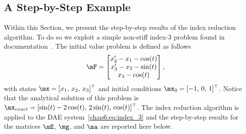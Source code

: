\subsection{A Step-by-Step Example}
\label{chap6:sec:step_by_step}

Within this Section, we present the step-by-step results of the index reduction algorithm. To do so we exploit a simple non-stiff index-3 problem found in \Wolfram{}~\Mathematica{} documentation~\cite{mathematica}. The initial value problem is defined as follows
%
\begin{equation}
  \label{chap6:eq:index_3}
  \mF = \begin{bmatrix}
    x^{\prime}_{2} - x_{1} - \cos(t) \\
    x^{\prime}_{3} - x_{2} - \sin(t) \\
    x_{3} - \cos(t)
  \end{bmatrix},
\end{equation}
%
with states $\mx = [x_{1}, \, x_{2}, \, x_{3}]^\top$ and initial conditions $\mx_{0} = [-1, \, 0, \, 1]^\top$. Notice that the analytical solution of this problem is $\mx_{exact} = [\sin(t) - 2\cos(t), \, 2\sin(t), \, \cos(t)]^\top$. The index reduction algorithm is applied to the \ac{DAE} system~\eqref{chap6:eq:index_3} and the step-by-step results for the matrices $\mE$, $\mg$, and $\ma$ are reported here below.
%
